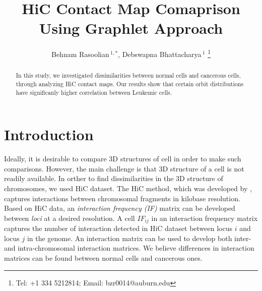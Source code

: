 \documentclass[a4,center,fleqn]{NAR}
\begin{document}
\title{HiC Contact Map Comaprison Using Graphlet Approach}

\author{%
    Behnam Rasoolian\,$^{1,*}$,
    Debswapna Bhattacharya\,$^{1}$
    \footnote{
    Tel: +1 334 5212814; Email: bzr0014@auburn.edu}}

    \address{%
        $^{1}$ Auburn University
        }


            \maketitle

\begin{abstract}

In this study, we investigated
dissimilarities between normal cells and cancerous cells,
through analyzing HiC contact maps. 
Our results show that certain orbit distributions
have significanly higher correlation 
between Leukemic cells.

\end{abstract}

\section{Introduction}

Ideally, it is desirable to compare 3D structures of 
cell in order to make such comparisons.
However, the main challenge is that 
3D structure of a cell is not readily available. 
In orther to find dissimilarities in the 3D structure of 
chromosomes, we used HiC dataset.
The HiC method, which was developed by 
\cite{lieberman2009comprehensive}, captures interactions between 
chromosomal fragments in kilobase resolution. Based on HiC data, an
\textit{interaction frequency (IF) } matrix can be developed 
between \textit{loci} at a desired resolution.
A cell $IF_{ij}$ in an interaction frequency matrix captures 
the number of interaction detected
in HiC dataset between locus $i$ and locus $j$ in the genome.
An interaction matrix can be used to develop both 
inter- and intra-chromosomal interaction matrices.
We believe differences in interaction matrices can 
be found between normal cells and cancerous ones.
\end{document}
